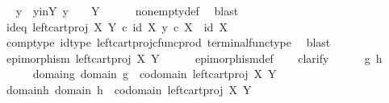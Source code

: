 \begin{isabellebody}
\ \isamarkupfalse%
\ y\ \ y{\isacharunderscore}{\kern0pt}in{\isacharunderscore}{\kern0pt}Y{\isacharcolon}{\kern0pt}\ {\isachardoublequoteopen}y\ {\isacharcolon}{\kern0pt}\ {\isasymone}\ {\isasymrightarrow}\ Y{\isachardoublequoteclose}\isanewline
\ \ \ \ \isamarkupfalse%
\ nonempty{\isacharunderscore}{\kern0pt}def\ \isamarkupfalse%
\ blast\isanewline
\ \ \isamarkupfalse%
\ \isamarkupfalse%
\ id{\isacharunderscore}{\kern0pt}eq{\isacharcolon}{\kern0pt}\ {\isachardoublequoteopen}{\isacharparenleft}{\kern0pt}left{\isacharunderscore}{\kern0pt}cart{\isacharunderscore}{\kern0pt}proj\ X\ Y{\isacharparenright}{\kern0pt}\ {\isasymcirc}\isactrlsub c\ {\isasymlangle}id\ X{\isacharcomma}{\kern0pt}\ y\ {\isasymcirc}\isactrlsub c\ {\isasymbeta}\isactrlbsub X\isactrlesub {\isasymrangle}\ {\isacharequal}{\kern0pt}\ id\ X{\isachardoublequoteclose}\isanewline
\ \ \ \ \isamarkupfalse%
\ comp{\isacharunderscore}{\kern0pt}type\ id{\isacharunderscore}{\kern0pt}type\ left{\isacharunderscore}{\kern0pt}cart{\isacharunderscore}{\kern0pt}proj{\isacharunderscore}{\kern0pt}cfunc{\isacharunderscore}{\kern0pt}prod\ terminal{\isacharunderscore}{\kern0pt}func{\isacharunderscore}{\kern0pt}type\ \isamarkupfalse%
\ blast\isanewline
\ \ \isamarkupfalse%
\ \isamarkupfalse%
\ {\isachardoublequoteopen}epimorphism\ {\isacharparenleft}{\kern0pt}left{\isacharunderscore}{\kern0pt}cart{\isacharunderscore}{\kern0pt}proj\ X\ Y{\isacharparenright}{\kern0pt}{\isachardoublequoteclose}\isanewline
\ \ \ \ \isamarkupfalse%
\ epimorphism{\isacharunderscore}{\kern0pt}def\isanewline
\ \ \isamarkupfalse%
\ clarify\isanewline
\ \ \ \ \isamarkupfalse%
\ g\ h\isanewline
\ \ \ \ \isamarkupfalse%
\ domain{\isacharunderscore}{\kern0pt}g{\isacharcolon}{\kern0pt}\ {\isachardoublequoteopen}domain\ g\ {\isacharequal}{\kern0pt}\ codomain\ {\isacharparenleft}{\kern0pt}left{\isacharunderscore}{\kern0pt}cart{\isacharunderscore}{\kern0pt}proj\ X\ Y{\isacharparenright}{\kern0pt}{\isachardoublequoteclose}\isanewline
\ \ \ \ \isamarkupfalse%
\ domain{\isacharunderscore}{\kern0pt}h{\isacharcolon}{\kern0pt}\ {\isachardoublequoteopen}domain\ h\ {\isacharequal}{\kern0pt}\ codomain\ {\isacharparenleft}{\kern0pt}left{\isacharunderscore}{\kern0pt}cart{\isacharunderscore}{\kern0pt}proj\ X\ Y{\isacharparenright}{\kern0pt}{\isachardoublequoteclose}\isanewline
\ \ \ \ \isamarkupfalse%

\end{isabellebody}
